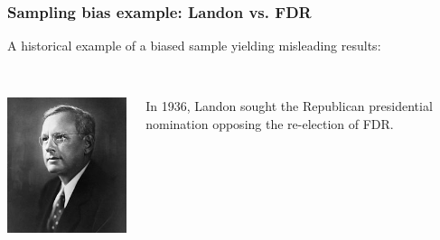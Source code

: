 \begin{frame}
\frametitle{Sampling bias example: Landon vs. FDR}

A historical example of a biased sample yielding misleading results: \\

$\:$ \\

\begin{columns}[c]


\includegraphics[width= \textwidth]{1-3_data_collection_principles/figures/landon_fdr/landon}

In 1936, Landon sought the Republican presidential nomination opposing the re-election of FDR.



\end{columns}
\end{frame}
